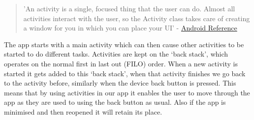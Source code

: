 \begin{quote} 'An activity is a single, focused thing that the user can do. Almost all activities interact with the user, so the Activity class takes care of creating a window for you in which you can place your UI' - \href{http://developer.android.com/reference/android/app/Activity.html}{Android Reference}
\end{quote}  

The app starts with a main activity which can then cause other activities to be started to do different tasks. Activities are kept on the ‘back stack’, which operates on the normal first in last out (FILO) order. When a new activity is started it gets added to this ‘back stack’, when that activity finishes we go back to the activity before, similarly when the device back button is pressed. This means that by using
activities in our app it enables the user to move through the app as they are used to using the back button as usual. Also if the app is minimised and then reopened it will retain its place.

